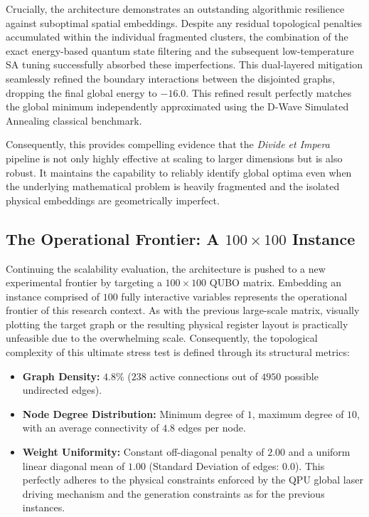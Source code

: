 Crucially, the architecture demonstrates an outstanding algorithmic resilience against suboptimal spatial embeddings. Despite any residual topological penalties accumulated within the individual fragmented clusters, the combination of the exact energy-based quantum state filtering and the subsequent low-temperature SA tuning successfully absorbed these imperfections. This dual-layered mitigation seamlessly refined the boundary interactions between the disjointed graphs, dropping the final global energy to $-16.0$. This refined result perfectly matches the global minimum independently approximated using the D-Wave Simulated Annealing classical benchmark.

Consequently, this provides compelling evidence that the \textit{Divide et Impera} pipeline is not only highly effective at scaling to larger dimensions but is also robust. It maintains the capability to reliably identify global optima even when the underlying mathematical problem is heavily fragmented and the isolated physical embeddings are geometrically imperfect.


\subsection{The Operational Frontier: A $100\times100$ Instance}
\label{subsec:divide_et_impera_100x100}

Continuing the scalability evaluation, the architecture is pushed to a new experimental frontier by targeting a $100\times100$ QUBO matrix. Embedding an instance comprised of $100$ fully interactive variables represents the operational frontier of this research context. As with the previous large-scale matrix, visually plotting the target graph or the resulting physical register layout is practically unfeasible due to the overwhelming scale. Consequently, the topological complexity of this ultimate stress test is defined through its structural metrics:

\begin{itemize}
    \item \textbf{Graph Density:} $4.8\%$ ($238$ active connections out of $4950$ possible undirected edges).
    \item \textbf{Node Degree Distribution:} Minimum degree of $1$, maximum degree of $10$, with an average connectivity of $4.8$ edges per node.
    \item \textbf{Weight Uniformity:} Constant off-diagonal penalty of $2.00$ and a uniform linear diagonal mean of $1.00$ (Standard Deviation of edges: $0.0$). This perfectly adheres to the physical constraints enforced by the QPU global laser driving mechanism and the generation constraints as for the previous instances.
\end{itemize}

